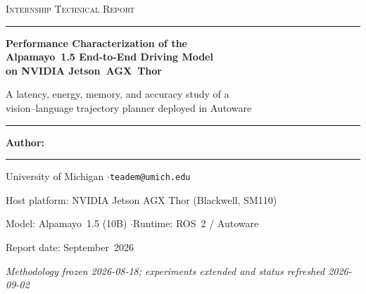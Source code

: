\documentclass[11pt,a4paper]{article}
\begin{document}
\begin{titlepage}
\centering
\vspace*{1.5cm}
{\Large\scshape Internship Technical Report\par}
\vspace{0.4cm}
{\color{accent}\rule{\linewidth}{1.2pt}}
\vspace{0.9cm}

{\huge\bfseries Performance Characterization of the\\[0.25em]
Alpamayo~1.5 End-to-End Driving Model\\[0.35em]
on NVIDIA Jetson~AGX~Thor\par}
\vspace{0.5cm}
{\large A latency, energy, memory, and accuracy study of a\\
vision--language trajectory planner deployed in Autoware\par}
\vspace{0.6cm}
{\color{accent}\rule{\linewidth}{1.2pt}}

\vspace{1.6cm}
{\large\bfseries Author:~\rule{5cm}{0.4pt}\par}      %
\vspace{0.3cm}
{\normalsize University of Michigan \quad$\cdot$\quad \texttt{teadem@umich.edu}\par}

\vfill
{\large Host platform: NVIDIA Jetson AGX Thor (Blackwell, SM110)\par}
{\large Model: Alpamayo~1.5 (10B) \quad$\cdot$\quad Runtime: ROS~2 / Autoware\par}
\vspace{0.8cm}
{\large Report date: September~2026\par}
{\normalsize\itshape Methodology frozen 2026-08-18; experiments extended and status refreshed 2026-09-02\par}
\end{titlepage}
\end{document}
